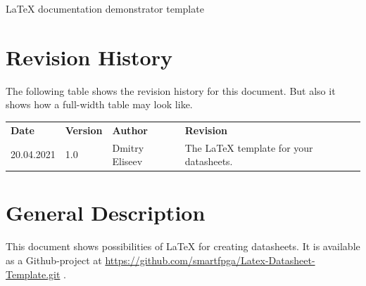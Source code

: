 \documentclass[a4paper, 10pt, onecolumn]{article}
\newcommand {\documentname}{LaTeX documentation demonstrator template}
\def\widehline{%
\noalign{\global\dimen1 \arrayrulewidth
\global\arrayrulewidth3\arrayrulewidth}%
\hline
\noalign{\global\arrayrulewidth\dimen1 }}
\newcommand{\chline}{%
    \arrayrulecolor{dimared}\widehline\arrayrulecolor{gray25}
}
\begin{document}
\thispagestyle{title}

\begin{flushleft}
\huge \documentname
\normalsize
\end{flushleft}

\section*{Revision History}
The following table shows the revision history for this document. But also it shows how a full-width table may look like.

\begin{table}[H]
\label{tab:revhist}
\centering\bgroup
\def\arraystretch{1.5}
\begin{tabularx}{\textwidth}{|l|l|l|X|}
    \hline
    \textbf{Date} & \textbf{Version} & \textbf{Author} & \textbf{Revision} \\ \chline
    20.04.2021 & 1.0 & Dmitry Eliseev & The LaTeX template for your datasheets.\\ \hline
\end{tabularx}
\egroup
\end{table}


\section*{General Description}
This document shows possibilities of LaTeX for creating datasheets. 
It is available as a Github-project at \url{https://github.com/smartfpga/Latex-Datasheet-Template.git} \cite{GithubLink}.
\end{document}
